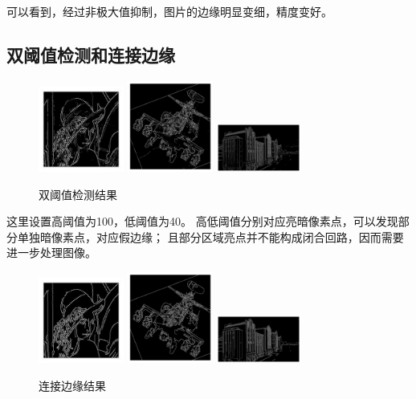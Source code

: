 \documentclass{article}
\begin{document}
    可以看到，经过非极大值抑制，图片的边缘明显变细，精度变好。
    
\subsection{双阈值检测和连接边缘}

\begin{figure}[h]
    \centering
    \includegraphics[width=0.25\textwidth]{./classify_100_40/1}
    \includegraphics[width=0.25\textwidth]{./classify_100_40/2}
    \includegraphics[width=0.25\textwidth]{./classify_100_40/3}
    \caption{双阈值检测结果}
\end{figure}

    这里设置高阈值为100，低阈值为40。
    高低阈值分别对应亮暗像素点，可以发现部分单独暗像素点，对应假边缘；
    且部分区域亮点并不能构成闭合回路，因而需要进一步处理图像。

\begin{figure}[h]
    \centering
    \includegraphics[width=0.25\textwidth]{./result/1_100_40}
    \includegraphics[width=0.25\textwidth]{./result/2_100_40}
    \includegraphics[width=0.25\textwidth]{./result/3_100_40}
    \caption{连接边缘结果}
\end{figure}
\end{document}
